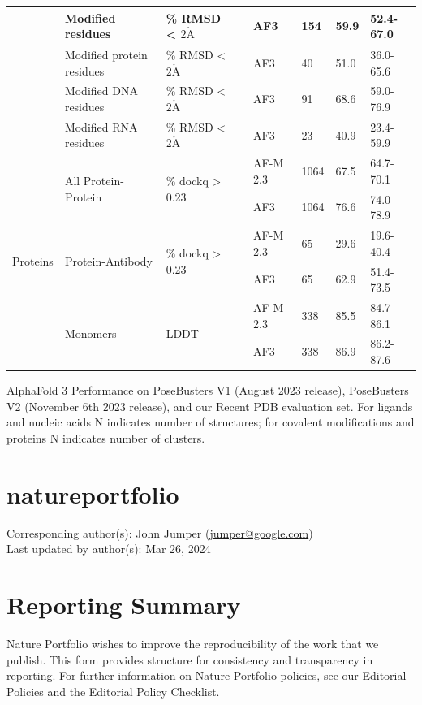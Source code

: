 \documentclass[10pt]{article}
\def\AA{\mathring{\mathrm{A}}}
\begin{document}
\begin{table}[h]
\begin{center}
\begin{tabular}{|l|l|l|l|l|l|l|l|}
\hline
 & Modified residues & \% RMSD < $2 \AA$ &  & AF3 & 154 & 59.9 & 52.4-67.0 \\
\hline
 & Modified protein residues & \% RMSD < $2 \AA$ &  & AF3 & 40 & 51.0 & 36.0-65.6 \\
\hline
 & Modified DNA residues & \% RMSD < $2 \AA$ &  & AF3 & 91 & 68.6 & 59.0-76.9 \\
\hline
 & Modified RNA residues & \% RMSD < $2 \AA$ &  & AF3 & 23 & 40.9 & 23.4-59.9 \\
\hline
\multirow[t]{6}{*}{Proteins} & \multirow[t]{2}{*}{All Protein-Protein} & \multirow[t]{2}{*}{\% dockq > 0.23} &  & AF-M 2.3 & 1064 & 67.5 & 64.7-70.1 \\
\hline
 &  &  &  & AF3 & 1064 & 76.6 & 74.0-78.9 \\
\hline
 & \multirow[t]{2}{*}{Protein-Antibody} & \multirow[t]{2}{*}{\% dockq > 0.23} &  & AF-M 2.3 & 65 & 29.6 & 19.6-40.4 \\
\hline
 &  &  &  & AF3 & 65 & 62.9 & 51.4-73.5 \\
\hline
 & \multirow[t]{2}{*}{Monomers} & \multirow[t]{2}{*}{LDDT} &  & AF-M 2.3 & 338 & 85.5 & 84.7-86.1 \\
\hline
 &  &  &  & AF3 & 338 & 86.9 & 86.2-87.6 \\
\hline
\end{tabular}
\end{center}
\end{table}

AlphaFold 3 Performance on PoseBusters V1 (August 2023 release), PoseBusters V2 (November 6th 2023 release), and our Recent PDB evaluation set. For ligands and nucleic acids N indicates number of structures; for covalent modifications and proteins N indicates number of clusters.

\section*{natureportfolio}
Corresponding author(s): John Jumper (\href{mailto:jumper@google.com}{jumper@google.com})\\
Last updated by author(s): Mar 26, 2024

\section*{Reporting Summary}
Nature Portfolio wishes to improve the reproducibility of the work that we publish. This form provides structure for consistency and transparency in reporting. For further information on Nature Portfolio policies, see our Editorial Policies and the Editorial Policy Checklist.
\end{document}
